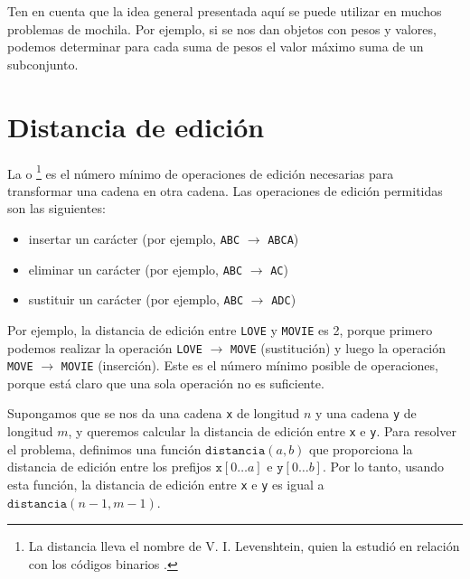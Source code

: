 Ten en cuenta que la idea general presentada aquí se puede utilizar
en muchos problemas de mochila.
Por ejemplo, si se nos dan objetos con pesos y valores,
podemos determinar para cada suma de pesos el valor máximo
suma de un subconjunto.

\section{Distancia de edición}


La  o \footnote{La distancia
    lleva el nombre de V. I. Levenshtein, quien la estudió en relación con los códigos binarios \cite{lev66}.}
es el número mínimo de operaciones de edición
necesarias para transformar una cadena
en otra cadena.
Las operaciones de edición permitidas son las siguientes:
\begin{itemize}
    \item insertar un carácter (por ejemplo, \texttt{ABC} $\rightarrow$ \texttt{ABCA})
    \item eliminar un carácter (por ejemplo, \texttt{ABC} $\rightarrow$ \texttt{AC})
    \item sustituir un carácter (por ejemplo, \texttt{ABC} $\rightarrow$ \texttt{ADC})
\end{itemize}

Por ejemplo, la distancia de edición entre
\texttt{LOVE} y \texttt{MOVIE} es 2,
porque primero podemos realizar la operación
\texttt{LOVE} $\rightarrow$ \texttt{MOVE}
(sustitución) y luego la operación
\texttt{MOVE} $\rightarrow$ \texttt{MOVIE}
(inserción).
Este es el número mínimo posible de operaciones,
porque está claro que una sola operación no es suficiente.

Supongamos que se nos da una cadena \texttt{x}
de longitud $n$ y una cadena \texttt{y} de longitud $m$,
y queremos calcular la distancia de edición entre
\texttt{x} e \texttt{y}.
Para resolver el problema, definimos una función
$\texttt{distancia}(a,b)$ que proporciona la
distancia de edición entre los prefijos
$\texttt{x}[0 \ldots a]$ e $\texttt{y}[0 \ldots b]$.
Por lo tanto, usando esta función, la distancia de edición
entre \texttt{x} e \texttt{y} es igual a $\texttt{distancia}(n-1,m-1)$.

